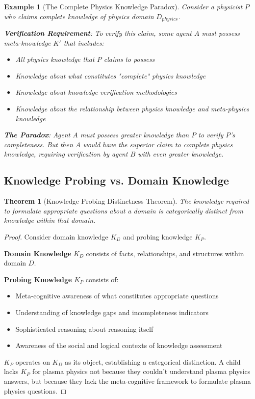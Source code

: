 \documentclass[12pt,a4paper]{article}
\newtheorem{example}{Example}
\newtheorem{theorem}{Theorem}[section]
\begin{document}
\begin{example}[The Complete Physics Knowledge Paradox]
Consider a physicist $P$ who claims complete knowledge of physics domain $D_{physics}$.

\textbf{Verification Requirement}: To verify this claim, some agent $A$ must possess meta-knowledge $K'$ that includes:
\begin{itemize}
\item All physics knowledge that $P$ claims to possess
\item Knowledge about what constitutes "complete" physics knowledge
\item Knowledge about knowledge verification methodologies
\item Knowledge about the relationship between physics knowledge and meta-physics knowledge
\end{itemize}

\textbf{The Paradox}: Agent $A$ must possess greater knowledge than $P$ to verify $P$'s completeness. But then $A$ would have the superior claim to complete physics knowledge, requiring verification by agent $B$ with even greater knowledge.
\end{example}

\subsection{Knowledge Probing vs. Domain Knowledge}

\begin{theorem}[Knowledge Probing Distinctness Theorem]
The knowledge required to formulate appropriate questions about a domain is categorically distinct from knowledge within that domain.
\end{theorem}

\begin{proof}
Consider domain knowledge $K_D$ and probing knowledge $K_P$.

\textbf{Domain Knowledge} $K_D$ consists of facts, relationships, and structures within domain $D$.

\textbf{Probing Knowledge} $K_P$ consists of:
\begin{itemize}
\item Meta-cognitive awareness of what constitutes appropriate questions
\item Understanding of knowledge gaps and incompleteness indicators  
\item Sophisticated reasoning about reasoning itself
\item Awareness of the social and logical contexts of knowledge assessment
\end{itemize}

$K_P$ operates on $K_D$ as its object, establishing a categorical distinction. A child lacks $K_P$ for plasma physics not because they couldn't understand plasma physics answers, but because they lack the meta-cognitive framework to formulate plasma physics questions.
\end{proof}
\end{document}
